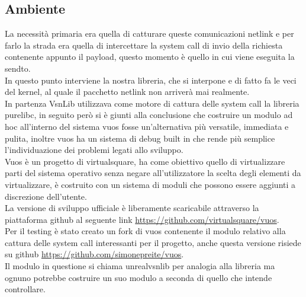 \subsection{Ambiente}
La necessit\`a primaria era quella di catturare queste comunicazioni netlink e per farlo la strada era quella di intercettare la system call di invio della richiesta contenente appunto il payload, questo momento \`e quello in cui viene eseguita la sendto.\\
In questo punto interviene la nostra libreria, che si interpone e di fatto fa le veci del kernel, al quale il pacchetto netlink non arriver\`a mai realmente.\\
In partenza VsnLib utilizzava come motore di cattura delle system call la libreria purelibc\cite{K8}, in seguito per\`o si \`e giunti alla conclusione che costruire un modulo ad hoc all'interno del sistema vuos fosse un'alternativa pi\`u versatile, immediata e pulita, inoltre vuos ha un sistema di debug built in che rende pi\`u semplice l'individuazione dei problemi legati allo sviluppo.\\
Vuos\cite{K5} \`e un progetto di virtualsquare, ha come obiettivo quello di virtualizzare parti del sistema operativo senza negare all'utilizzatore la scelta degli elementi da virtualizzare, \`e costruito con un sistema di moduli che possono essere aggiunti a discrezione dell'utente.\\
La versione di sviluppo ufficiale \`e liberamente scaricabile attraverso la piattaforma github al seguente link \url{https://github.com/virtualsquare/vuos}. \\
Per il testing \`e stato creato un fork di vuos contenente il modulo relativo alla cattura delle system call interessanti per il progetto, anche questa versione risiede su github \url{https://github.com/simonepreite/vuos}.\\
Il modulo in questione si chiama unrealvsnlib per analogia alla libreria ma ognuno potrebbe costruire un suo modulo a seconda di quello che intende controllare.\\

